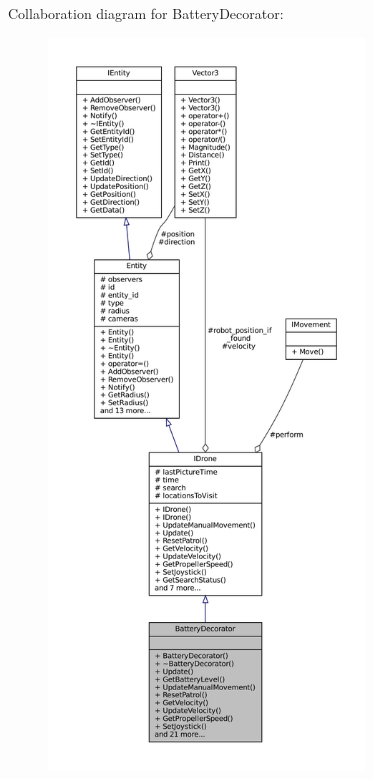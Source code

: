Collaboration diagram for Battery\+Decorator\+:\nopagebreak
\begin{figure}[H]
\begin{center}
\leavevmode
\includegraphics[height=550pt]{classBatteryDecorator__coll__graph}
\end{center}
\end{figure}

